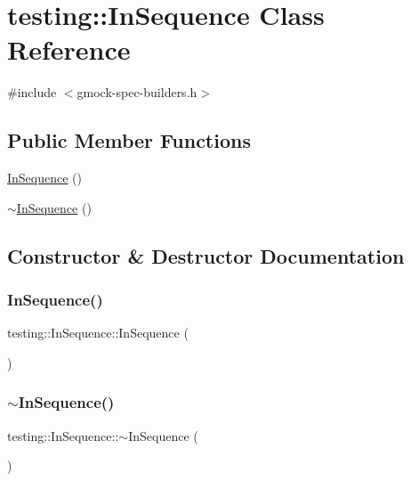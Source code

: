 \hypertarget{classtesting_1_1_in_sequence}{}\section{testing\+:\+:In\+Sequence Class Reference}
\label{classtesting_1_1_in_sequence}


{\ttfamily \#include $<$gmock-\/spec-\/builders.\+h$>$}

\subsection*{Public Member Functions}
\begin{DoxyCompactItemize}
\item 
\hyperlink{classtesting_1_1_in_sequence_ac40a4ac3e4f26e088ebc09e543514b6b}{In\+Sequence} ()
\item 
\hyperlink{classtesting_1_1_in_sequence_afe11b11ccb5f55daea5f1e0a9a1af48f}{$\sim$\+In\+Sequence} ()
\end{DoxyCompactItemize}


\subsection{Constructor \& Destructor Documentation}
\mbox{\label{classtesting_1_1_in_sequence_ac40a4ac3e4f26e088ebc09e543514b6b}} 
\subsubsection{\texorpdfstring{In\+Sequence()}{InSequence()}}
{\footnotesize\ttfamily testing\+::\+In\+Sequence\+::\+In\+Sequence (\begin{DoxyParamCaption}{ }\end{DoxyParamCaption})}

\mbox{\label{classtesting_1_1_in_sequence_afe11b11ccb5f55daea5f1e0a9a1af48f}} 
\subsubsection{\texorpdfstring{$\sim$\+In\+Sequence()}{~InSequence()}}
{\footnotesize\ttfamily testing\+::\+In\+Sequence\+::$\sim$\+In\+Sequence (\begin{DoxyParamCaption}{ }\end{DoxyParamCaption})}



